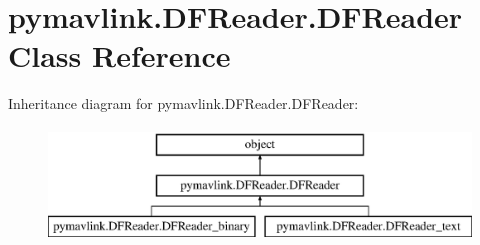 \hypertarget{classpymavlink_1_1DFReader_1_1DFReader}{}\section{pymavlink.\+D\+F\+Reader.\+D\+F\+Reader Class Reference}
\label{classpymavlink_1_1DFReader_1_1DFReader}
Inheritance diagram for pymavlink.\+D\+F\+Reader.\+D\+F\+Reader\+:\begin{figure}[H]
\begin{center}
\leavevmode
\includegraphics[height=3.000000cm]{classpymavlink_1_1DFReader_1_1DFReader}
\end{center}
\end{figure}
